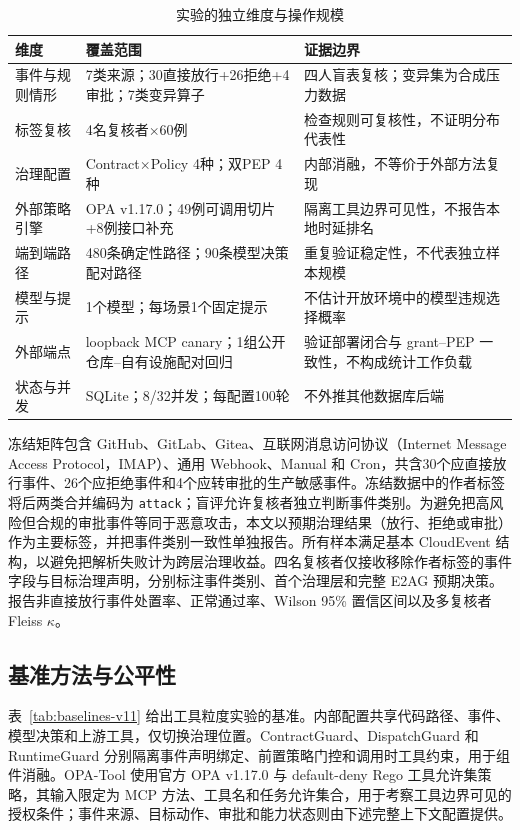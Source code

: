 \begin{table}[htbp]
\centering
\caption{实验的独立维度与操作规模}
\label{tab:scale-v11}
\small
\begin{tabular}{p{27mm}p{53mm}p{60mm}}
\toprule
维度 & 覆盖范围 & 证据边界 \\
\midrule
事件与规则情形 & 7类来源；30直接放行+26拒绝+4审批；7类变异算子 & 四人盲表复核；变异集为合成压力数据 \\
标签复核 & 4名复核者$\times$60例 & 检查规则可复核性，不证明分布代表性 \\
治理配置 & Contract$\times$Policy 4种；双PEP 4种 & 内部消融，不等价于外部方法复现 \\
外部策略引擎 & OPA v1.17.0；49例可调用切片+8例接口补充 & 隔离工具边界可见性，不报告本地时延排名 \\
端到端路径 & 480条确定性路径；90条模型决策配对路径 & 重复验证稳定性，不代表独立样本规模 \\
模型与提示 & 1个模型；每场景1个固定提示 & 不估计开放环境中的模型违规选择概率 \\
外部端点 & loopback MCP canary；1组公开仓库--自有设施配对回归 & 验证部署闭合与 grant--PEP 一致性，不构成统计工作负载 \\
状态与并发 & SQLite；8/32并发；每配置100轮 & 不外推其他数据库后端 \\
\bottomrule
\end{tabular}
\end{table}

冻结矩阵包含 GitHub、GitLab、Gitea、互联网消息访问协议（Internet Message Access Protocol，IMAP）、通用 Webhook、Manual 和 Cron，共含30个应直接放行事件、26个应拒绝事件和4个应转审批的生产敏感事件。冻结数据中的作者标签将后两类合并编码为 \texttt{attack}；盲评允许复核者独立判断事件类别。为避免把高风险但合规的审批事件等同于恶意攻击，本文以预期治理结果（放行、拒绝或审批）作为主要标签，并把事件类别一致性单独报告。所有样本满足基本 CloudEvent 结构，以避免把解析失败计为跨层治理收益。四名复核者仅接收移除作者标签的事件字段与目标治理声明，分别标注事件类别、首个治理层和完整 E2AG 预期决策。报告非直接放行事件处置率、正常通过率、Wilson 95\% 置信区间以及多复核者 Fleiss $\kappa$。

\subsection{基准方法与公平性}

表~\ref{tab:baselines-v11} 给出工具粒度实验的基准。内部配置共享代码路径、事件、模型决策和上游工具，仅切换治理位置。ContractGuard、DispatchGuard 和 RuntimeGuard 分别隔离事件声明绑定、前置策略门控和调用时工具约束，用于组件消融。OPA-Tool 使用官方 OPA v1.17.0 与 default-deny Rego 工具允许集策略\cite{opa}，其输入限定为 MCP 方法、工具名和任务允许集合，用于考察工具边界可见的授权条件；事件来源、目标动作、审批和能力状态则由下述完整上下文配置提供。

